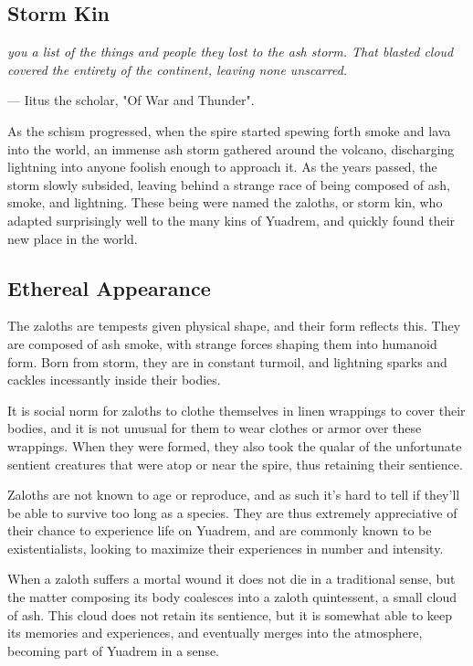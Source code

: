 \begin{linenumbers}

\section{Storm Kin}
\textit{you a list of the things and people they lost to the ash storm.
That blasted cloud covered the entirety of the continent, leaving none unscarred.}

\hspace*{\fill} --- Iitus the scholar, "Of War and Thunder".

As the schism progressed, when the spire started spewing forth smoke and lava into the world, an immense ash storm gathered around the volcano, discharging lightning into anyone foolish enough to approach it.
As the years passed, the storm slowly subsided, leaving behind a strange race of being composed of ash, smoke, and lightning.
These being were named the zaloths, or storm kin, who adapted surprisingly well to the many kins of Yuadrem, and quickly found their new place in the world.

\subsection*{Ethereal Appearance}
The zaloths are tempests given physical shape, and their form reflects this.
They are composed of ash smoke, with strange forces shaping them into humanoid form.
Born from storm, they are in constant turmoil, and lightning sparks and cackles incessantly inside their bodies.

It is social norm for zaloths to clothe themselves in linen wrappings to cover their bodies, and it is not unusual for them to wear clothes or armor over these wrappings.
When they were formed, they also took the qualar of the unfortunate sentient creatures that were atop or near the spire, thus retaining their sentience.

Zaloths are not known to age or reproduce, and as such it's hard to tell if they'll be able to survive too long as a species.
They are thus extremely appreciative of their chance to experience life on Yuadrem, and are commonly known to be existentialists, looking to maximize their experiences in number and intensity.

When a zaloth suffers a mortal wound it does not die in a traditional sense, but the matter composing its body coalesces into a zaloth quintessent, a small cloud of ash.
This cloud does not retain its sentience, but it is somewhat able to keep its memories and experiences, and eventually merges into the atmosphere, becoming part of Yuadrem in a sense.


\end{linenumbers}
